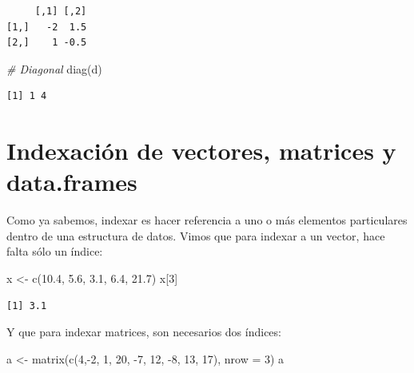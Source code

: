 \documentclass[
]{book}
\newenvironment{Shaded}{\begin{snugshade}}{\end{snugshade}}
\newcommand{\AttributeTok}[1]{\textcolor[rgb]{0.77,0.63,0.00}{#1}}
\newcommand{\CommentTok}[1]{\textcolor[rgb]{0.56,0.35,0.01}{\textit{#1}}}
\newcommand{\DecValTok}[1]{\textcolor[rgb]{0.00,0.00,0.81}{#1}}
\newcommand{\FloatTok}[1]{\textcolor[rgb]{0.00,0.00,0.81}{#1}}
\newcommand{\FunctionTok}[1]{\textcolor[rgb]{0.00,0.00,0.00}{#1}}
\newcommand{\NormalTok}[1]{#1}
\newcommand{\OtherTok}[1]{\textcolor[rgb]{0.56,0.35,0.01}{#1}}
\newcommand{\SpecialCharTok}[1]{\textcolor[rgb]{0.00,0.00,0.00}{#1}}
\begin{document}
\begin{verbatim}
     [,1] [,2]
[1,]   -2  1.5
[2,]    1 -0.5
\end{verbatim}

\begin{Shaded}
\begin{Highlighting}[]
\CommentTok{\# Diagonal}
\FunctionTok{diag}\NormalTok{(d)}
\end{Highlighting}
\end{Shaded}

\begin{verbatim}
[1] 1 4
\end{verbatim}

\hypertarget{indexaciuxf3n-de-vectores-matrices-y-data.frames}{%
\section{Indexación de vectores, matrices y data.frames}\label{indexaciuxf3n-de-vectores-matrices-y-data.frames}}

Como ya sabemos, indexar es hacer referencia a uno o más elementos particulares dentro de una estructura de datos. Vimos que para indexar a un vector, hace falta sólo un índice:

\begin{Shaded}
\begin{Highlighting}[]
\NormalTok{x }\OtherTok{\textless{}{-}} \FunctionTok{c}\NormalTok{(}\FloatTok{10.4}\NormalTok{, }\FloatTok{5.6}\NormalTok{, }\FloatTok{3.1}\NormalTok{, }\FloatTok{6.4}\NormalTok{, }\FloatTok{21.7}\NormalTok{)}
\NormalTok{x[}\DecValTok{3}\NormalTok{]}
\end{Highlighting}
\end{Shaded}

\begin{verbatim}
[1] 3.1
\end{verbatim}

Y que para indexar matrices, son necesarios dos índices:

\begin{Shaded}
\begin{Highlighting}[]
\NormalTok{a }\OtherTok{\textless{}{-}} \FunctionTok{matrix}\NormalTok{(}\FunctionTok{c}\NormalTok{(}\DecValTok{4}\NormalTok{,}\SpecialCharTok{{-}}\DecValTok{2}\NormalTok{, }\DecValTok{1}\NormalTok{, }\DecValTok{20}\NormalTok{, }\SpecialCharTok{{-}}\DecValTok{7}\NormalTok{, }\DecValTok{12}\NormalTok{, }\SpecialCharTok{{-}}\DecValTok{8}\NormalTok{, }\DecValTok{13}\NormalTok{, }\DecValTok{17}\NormalTok{), }\AttributeTok{nrow =} \DecValTok{3}\NormalTok{)}
\NormalTok{a}
\end{Highlighting}
\end{Shaded}
\end{document}
